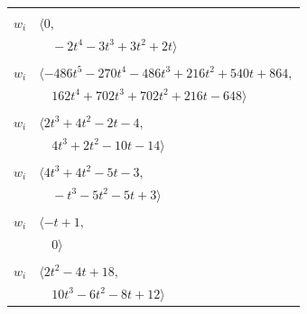 \documentclass[11pt]{article}
\begin{document}
\begin{longtable}{@{}ll@{}}
\addlinespace[2pt]
\multicolumn{2}{@{}p{0.97\textwidth}@{}}{$i=23$, $D_i=1$, $\rho_{ij}$: $1{:}2, \allowbreak 6{:}2, \allowbreak 7{:}1, \allowbreak 9{:}1, \allowbreak 20{:}1, \allowbreak 25{:}1, \allowbreak 29{:}1, \allowbreak 31{:}2$}\\
$w_i$ & $\langle 0,$\\
 & $\quad -2t^{4}-3t^{3}+3t^{2}+2t\rangle$\\
\addlinespace[2pt]
\multicolumn{2}{@{}p{0.97\textwidth}@{}}{$i=24$, $D_i=27$, $\rho_{ij}$: $1{:}1, \allowbreak 3{:}2, \allowbreak 4{:}2, \allowbreak 8{:}2, \allowbreak 12{:}1, \allowbreak 14{:}1, \allowbreak 15{:}2, \allowbreak 16{:}2, \allowbreak 18{:}2, \allowbreak 20{:}1, \allowbreak 21{:}1, \allowbreak 27{:}1$}\\
$w_i$ & $\langle -486t^{5}-270t^{4}-486t^{3}+216t^{2}+540t+864,$\\
 & $\quad 162t^{4}+702t^{3}+702t^{2}+216t-648\rangle$\\
\addlinespace[2pt]
\multicolumn{2}{@{}p{0.97\textwidth}@{}}{$i=25$, $D_i=1$, $\rho_{ij}$: $0{:}2, \allowbreak 1{:}1, \allowbreak 9{:}2, \allowbreak 11{:}1, \allowbreak 19{:}1, \allowbreak 23{:}2, \allowbreak 30{:}1, \allowbreak 32{:}1$}\\
$w_i$ & $\langle 2t^{3}+4t^{2}-2t-4,$\\
 & $\quad 4t^{3}+2t^{2}-10t-14\rangle$\\
\addlinespace[2pt]
\multicolumn{2}{@{}p{0.97\textwidth}@{}}{$i=26$, $D_i=1$, $\rho_{ij}$: $2{:}2, \allowbreak 4{:}2, \allowbreak 5{:}2, \allowbreak 6{:}2, \allowbreak 10{:}1, \allowbreak 18{:}2, \allowbreak 19{:}2, \allowbreak 21{:}1, \allowbreak 29{:}1$}\\
$w_i$ & $\langle 4t^{3}+4t^{2}-5t-3,$\\
 & $\quad -t^{3}-5t^{2}-5t+3\rangle$\\
\addlinespace[2pt]
\multicolumn{2}{@{}p{0.97\textwidth}@{}}{$i=27$, $D_i=1$, $\rho_{ij}$: $24{:}2, \allowbreak 33{:}1$}\\
$w_i$ & $\langle -t+1,$\\
 & $\quad 0\rangle$\\
\addlinespace[2pt]
\multicolumn{2}{@{}p{0.97\textwidth}@{}}{$i=28$, $D_i=1$, $\rho_{ij}$: $1{:}2, \allowbreak 2{:}2, \allowbreak 5{:}1, \allowbreak 6{:}2, \allowbreak 11{:}2, \allowbreak 22{:}1, \allowbreak 29{:}2, \allowbreak 30{:}1, \allowbreak 32{:}1$}\\
$w_i$ & $\langle 2t^{2}-4t+18,$\\
 & $\quad 10t^{3}-6t^{2}-8t+12\rangle$\\

\end{longtable}
\end{document}
